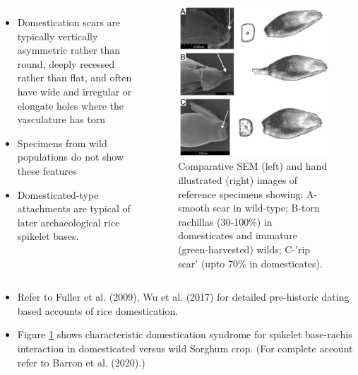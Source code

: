 \documentclass[
  ignorenonframetext,
  aspectratio=169]{beamer}
\providecommand{\tightlist}{%
  \setlength{\itemsep}{0pt}\setlength{\parskip}{0pt}}
\begin{document}
\begin{frame}{}
\protect\hypertarget{section}{}
\begin{columns}{}
  \begin{itemize}
  \footnotesize
  \item Domestication scars are typically vertically asymmetric rather than round, deeply recessed rather than flat, and often have wide and irregular or elongate holes where the vasculature has torn
  \item Specimens from wild populations do not show these features
  \item Domesticated-type attachments are typical of later archaeological rice spikelet bases.
  \end{itemize}


\begin{figure}
\includegraphics[width=0.65\linewidth]{../images/comparative-sem-spikelet-scar-types} \caption{Comparative SEM (left) and hand illustrated (right) images of reference specimens showing: A-smooth scar in wild-type; B-torn rachillas (30-100\%) in domesticates and immature (green-harvested) wilds; C-'rip scar' (upto 70\% in domesticates).}\label{fig:domesticated-wild-spikelet-base}
\end{figure}

\end{columns}

\footnotesize

\begin{itemize}
\tightlist
\item
  Refer to Fuller et al. (2009), Wu et al. (2017) for detailed
  pre-historic dating based accounts of rice domestication.
\item
  Figure \ref{fig:domesticated-wild-spikelet-base} shows characteristic
  domestication syndrome for spikelet base-rachis interaction in
  domesticated versus wild Sorghum crop. (For complete account refer to
  Barron et al. (2020).)
\end{itemize}
\end{frame}
\end{document}
